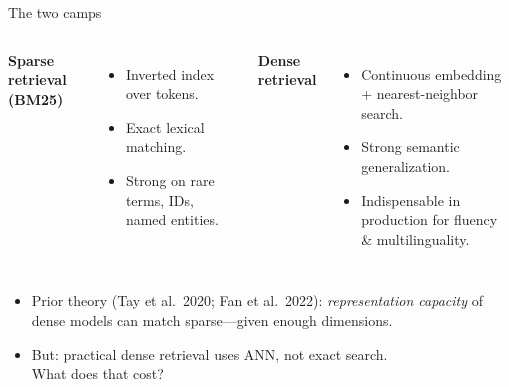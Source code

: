 \documentclass[10pt,aspectratio=169]{beamer}
\begin{document}
\begin{frame}{The two camps}
  \begin{columns}[T]
    \textbf{Sparse retrieval (BM25)}
    \begin{itemize}
      \item Inverted index over tokens.
      \item Exact lexical matching.
      \item Strong on rare terms, IDs, named entities.
    \end{itemize}

    \textbf{Dense retrieval}
    \begin{itemize}
      \item Continuous embedding + nearest-neighbor search.
      \item Strong semantic generalization.
      \item Indispensable in production for fluency \& multilinguality.
    \end{itemize}
  \end{columns}

  \vspace{1em}
  \begin{itemize}
    \item Prior theory (Tay et al.\ 2020; Fan et al.\ 2022):
          \emph{representation capacity} of dense models can match sparse---given
          enough dimensions.
    \item But: practical dense retrieval uses ANN, not exact search.\\
          \alert{What does that cost?}
  \end{itemize}
\end{frame}
\end{document}
